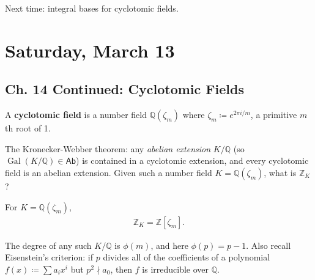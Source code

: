 Next time: integral bases for cyclotomic fields.

\hypertarget{saturday-march-13-1}{%
\section{Saturday, March 13}\label{saturday-march-13-1}}

\hypertarget{ch.-14-continued-cyclotomic-fields}{%
\subsection{Ch. 14 Continued: Cyclotomic
Fields}\label{ch.-14-continued-cyclotomic-fields}}

\begin{definition}

A \textbf{cyclotomic field} is a number field \({\mathbb{Q}}( \zeta_m)\)
where \(\zeta_m \coloneqq e^{2\pi i / m}\), a primitive \(m\)th root of
1.

\end{definition}

\begin{remark}

The Kronecker-Webber theorem: any \emph{abelian extension}
\(K/{\mathbb{Q}}\) (so
\(\operatorname{Gal}(K/{\mathbb{Q}}) \in {\mathsf{Ab}}\)) is contained
in a cyclotomic extension, and every cyclotomic field is an abelian
extension. Given such a number field \(K = {\mathbb{Q}}( \zeta_m)\),
what is \({\mathbb{Z}}_K\)?

\end{remark}

\begin{theorem}

For \(K = {\mathbb{Q}}( \zeta_m)\),
\begin{align*}
{\mathbb{Z}}_K = {\mathbb{Z}}[ \zeta_m ]
.\end{align*}

\end{theorem}

\begin{remark}

The degree of any such \(K/{\mathbb{Q}}\) is \(\phi(m)\), and here
\(\phi(p) = p-1\). Also recall Eisenstein's criterion: if \(p\) divides
all of the coefficients of a polynomial \(f(x) \coloneqq\sum a_i x^i\)
but \(p^2\nmid a_0\), then \(f\) is irreducible over \({\mathbb{Q}}\).

\end{remark}

